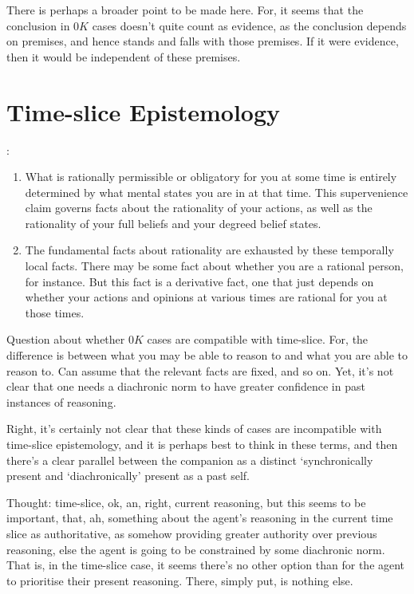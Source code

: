 \documentclass[10pt]{article}
\begin{document}
There is perhaps a broader point to be made here.
For, it seems that the conclusion in \(0K\) cases doesn't quite count as evidence, as the conclusion depends on premises, and hence stands and falls with those premises.
If it were evidence, then it would be independent of these premises.

\section{Time-slice Epistemology}
\label{sec:time-slice-epist}

\textcite[172]{Moss:2015aa}:

\begin{enumerate}
\item What is rationally permissible or obligatory for you at some time is entirely determined by what mental states you are in at that time.
  This supervenience claim governs facts about the rationality of your actions, as well as the rationality of your full beliefs and your degreed belief states.
\item The fundamental facts about rationality are exhausted by these temporally local facts.
  There may be some fact about whether you are a rational person, for instance.
  But this fact is a derivative fact, one that just depends on whether your actions and opinions at various times are rational for you at those times.
\end{enumerate}

Question about whether \(0K\) cases are compatible with time-slice.
For, the difference is between what you may be able to reason to and what you are able to reason to.
Can assume that the relevant facts are fixed, and so on.
Yet, it's not clear that one needs a diachronic norm to have greater confidence in past instances of reasoning.

Right, it's certainly not clear that these kinds of cases are incompatible with time-slice epistemology, and it is perhaps best to think in these terms, and then there's a clear parallel between the companion as a distinct `synchronically present and `diachronically' present as a past self.

Thought: time-slice, ok, an, right, current reasoning, but this seems to be important, that, ah, something about the agent's reasoning in the current time slice as authoritative, as somehow providing greater authority over previous reasoning, else the agent is going to be constrained by some diachronic norm.
That is, in the time-slice case, it seems there's no other option than for the agent to prioritise their present reasoning.
There, simply put, is nothing else.
\end{document}
